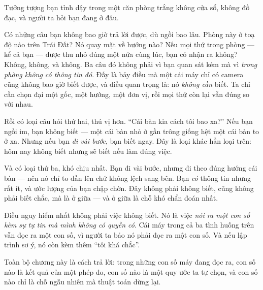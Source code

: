 \documentclass[../../vslam.tex]{subfiles}
\begin{document}
\begin{dongian}
Tưởng tượng bạn tỉnh dậy trong một căn phòng trắng không cửa sổ, không đồ đạc, và người ta hỏi bạn đang ở đâu.

Có những câu bạn không bao giờ trả lời được, dù ngồi bao lâu. Phòng này ở toạ độ nào trên Trái Đất? Nó quay mặt về hướng nào? Nếu mọi thứ trong phòng --- kể cả bạn --- được thu nhỏ đúng một nửa cùng lúc, bạn có nhận ra không? Không, không, và không. Ba câu đó không phải vì bạn quan sát kém mà vì \emph{trong phòng không có thông tin đó}. Đấy là bảy điều mà một cái máy chỉ có camera cũng không bao giờ biết được, và điều quan trọng là: nó \emph{không cần} biết. Ta chỉ cần chọn đại một gốc, một hướng, một đơn vị, rồi mọi thứ còn lại vẫn đúng so với nhau.

Rồi có loại câu hỏi thứ hai, thú vị hơn. ``Cái bàn kia cách tôi bao xa?'' Nếu bạn ngồi im, bạn không biết --- một cái bàn nhỏ ở gần trông giống hệt một cái bàn to ở xa. Nhưng nếu bạn \emph{đi vài bước}, bạn biết ngay. Đây là loại khác hẳn loại trên: hôm nay không biết nhưng sẽ biết nếu làm đúng việc.

Và có loại thứ ba, khó chịu nhất. Bạn đi vài bước, nhưng đi theo đúng hướng cái bàn --- nên nó chỉ to dần lên chứ không lệch sang bên. Bạn \emph{có} thông tin nhưng rất ít, và ước lượng của bạn chập chờn. Đây không phải không biết, cũng không phải biết chắc, mà là ở giữa --- và ở giữa là chỗ khó chẩn đoán nhất.

Điều nguy hiểm nhất không phải việc không biết. Nó là việc \emph{nói ra một con số kèm sự tự tin mà mình không có quyền có}. Cái máy trong cả ba tình huống trên vẫn đọc ra một con số, vì người ta bảo nó phải đọc ra một con số. Và nếu lập trình sơ ý, nó còn kèm thêm ``tôi khá chắc''.

Toàn bộ chương này là cách trả lời: trong những con số máy đang đọc ra, con số nào là kết quả của một phép đo, con số nào là một quy ước ta tự chọn, và con số nào chỉ là chỗ ngẫu nhiên mà thuật toán dừng lại.

\end{dongian}
\end{document}

